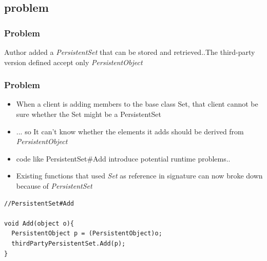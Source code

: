 \documentclass{beamer}
\begin{document}
\subsection{problem}
\begin{frame}
  \frametitle{Problem}
	Author added a \textit{PersistentSet} that can be stored and retrieved..The third-party version defined accept only \textit{PersistentObject} \\
	\begin{center}
	\end{center}
\end{frame}

\begin{frame}[containsverbatim]
  \frametitle{Problem}
  \begin{itemize}
	\item When a client is adding members to the base class Set, that client cannot be sure whether the Set might be a PersistentSet 
	\item ... so It can't know whether the elements it adds should be derived from \textit{PersistentObject}
	\item code like PersistentSet\#Add introduce potential runtime problems..
	\item Existing functions that used \textit{Set} as reference in signature can now broke down because of \textit{PersistentSet}
   \end{itemize}
   \begin{lstlisting}
//PersistentSet#Add
   
void Add(object o){
  PersistentObject p = (PersistentObject)o;
  thirdPartyPersistentSet.Add(p);
}
	\end{lstlisting}
\end{frame}
\end{document}
